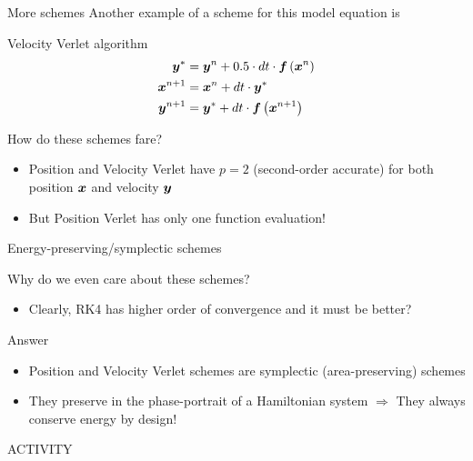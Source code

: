 \documentclass[presentation]{beamer}
\newcommand{\gv}[1]{\ensuremath{\mbox{\boldmath$ #1 $}}}
\begin{document}
\begin{frame}[label={sec:orgaac0a7f}]{More schemes}
Another example of a scheme for this model equation is
\begin{block}{Velocity Verlet algorithm}
\begin{equation*}
\begin{aligned}
\gv{y}^* &= \gv{y}^n + 0.5\cdot dt \cdot \gv{f}\left( \gv{x}^n\right) \\
\gv{x}^{n+1} &= \gv{x}^{n} + dt \cdot \gv{y}^{*} \\
\gv{y}^{n+1} &= \gv{y}^* + dt \cdot \gv{f}\left( \gv{x}^{n+1}\right) \\
\end{aligned}
\end{equation*}
\end{block}
\begin{block}{How do these schemes fare?}
\begin{itemize}
\item Position and Velocity Verlet have \(p = 2\) (second-order accurate) for
both position \(\gv{x}\) and velocity \(\gv{y}\)
\item But Position Verlet has only \alert{one} function evaluation!
\end{itemize}
\end{block}
\end{frame}
\begin{frame}[label={sec:orgfc55840}]{Energy-preserving/symplectic schemes}
\begin{block}{Why do we even care about these schemes?}
\begin{itemize}
\item Clearly, RK4 has higher order of convergence and it must be better?
\end{itemize}
\end{block}
\begin{block}{Answer}
\begin{itemize}
\item Position and Velocity Verlet schemes are symplectic (area-preserving) schemes
\item They preserve in the phase-portrait of a Hamiltonian system \(\Rightarrow\)
They always conserve energy by design!
\end{itemize}

\alert{ACTIVITY}
\end{block}
\end{frame}
\end{document}
